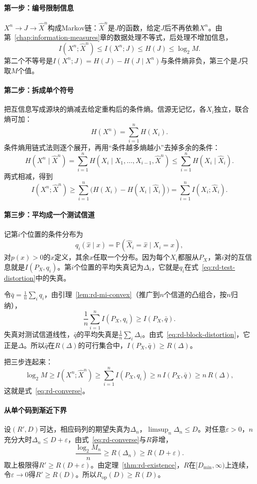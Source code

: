 \paragraph{第一步：编号限制信息}
$X^{n}\to J\to\hat{X}^{n}$构成Markov链：$\hat{X}^{n}$是$J$的函数，给定$J$后不再依赖$X^{n}$。由第~\ref{chap:information-measures}章的数据处理不等式，后处理不增加信息，
\[
  I(X^{n};\hat{X}^{n})\leq I(X^{n};J)\leq H(J)\leq\log_2M .
\]
第二个不等号是$I(X^{n};J)=H(J)-H(J\mid X^{n})$与条件熵非负，第三个是$J$只取$M$个值。

\paragraph{第二步：拆成单个符号}
把互信息写成源块的熵减去给定重构后的条件熵。信源无记忆，各$X_i$独立，联合熵可加：
\[
  H(X^{n})=\sum_{i=1}^{n}H(X_i).
\]
条件熵用链式法则逐个展开，再用“条件越多熵越小”去掉多余的条件：
\[
  H(X^{n}\mid\hat{X}^{n})=\sum_{i=1}^{n}H(X_i\mid X_1,\dots,X_{i-1},\hat{X}^{n})\leq\sum_{i=1}^{n}H(X_i\mid\hat{X}_i).
\]
两式相减，得到
\[
  I(X^{n};\hat{X}^{n})\geq\sum_{i=1}^{n}\bigl(H(X_i)-H(X_i\mid\hat{X}_i)\bigr)=\sum_{i=1}^{n}I(X_i;\hat{X}_i).
\]

\paragraph{第三步：平均成一个测试信道}
记第$i$个位置的条件分布为
\[
  q_i(\hat{x}\mid x)=\mathbb{P}(\hat{X}_i=\hat{x}\mid X_i=x),
\]
对$p(x)>0$的$x$定义，其余$x$任取一个分布。因为每个$X_i$都服从$P_X$，第$i$对的互信息就是$I(P_X,q_i)$。第$i$个位置的平均失真记为$\Delta_i$，它就是$q_i$在式~\eqref{eq:rd-test-distortion}中的失真。

令$\bar{q}=\frac1n\sum_iq_i$，由引理~\ref{lem:rd-mi-convex}（推广到$n$个信道的凸组合，按$n$归纳），
\[
  \frac1n\sum_{i=1}^{n}I(P_X,q_i)\geq I(P_X,\bar{q}).
\]
失真对测试信道线性，$\bar{q}$的平均失真是$\frac1n\sum_i\Delta_i$。由式~\eqref{eq:rd-block-distortion}，它正是$\Delta$。所以$\bar{q}$在$R(\Delta)$的可行集合中，$I(P_X,\bar{q})\geq R(\Delta)$。

把三步连起来：
\[
  \log_2M\geq I(X^{n};\hat{X}^{n})\geq\sum_{i=1}^{n}I(P_X,q_i)\geq n\,I(P_X,\bar{q})\geq n\,R(\Delta),
\]
这就是式~\eqref{eq:rd-converse}。

\paragraph{从单个码到渐近下界}
设$(R',D)$可达，相应码列的期望失真为$\Delta_n$，$\limsup_n\Delta_n\leq D$。对任意$\varepsilon>0$，$n$充分大时$\Delta_n\leq D+\varepsilon$，由式~\eqref{eq:rd-converse}与$R$非增，
\[
  \frac{\log_2M_n}{n}\geq R(\Delta_n)\geq R(D+\varepsilon).
\]
取上极限得$R'\geq R(D+\varepsilon)$。由定理~\ref{thm:rd-existence}，$R$在$[D_{\min},\infty)$上连续，令$\varepsilon\to0$得$R'\geq R(D)$。所以$R_{\mathrm{op}}(D)\geq R(D)$。

